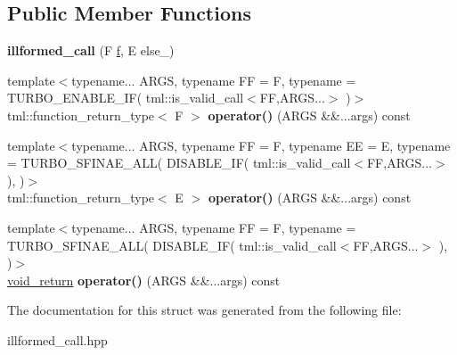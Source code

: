 \subsection*{Public Member Functions}
\begin{DoxyCompactItemize}
\item 
\hypertarget{structtml_1_1runtime_1_1illformed__call_a14d3576d333931e364d0717a5c438d69}{{\bfseries illformed\+\_\+call} (F \hyperlink{structf}{f}, E else\+\_\+)}\label{structtml_1_1runtime_1_1illformed__call_a14d3576d333931e364d0717a5c438d69}

\item 
\hypertarget{structtml_1_1runtime_1_1illformed__call_a52f1eca7b1c4be18fc23d7affe031c80}{{\footnotesize template$<$typename... A\+R\+G\+S, typename F\+F  = F, typename  = T\+U\+R\+B\+O\+\_\+\+E\+N\+A\+B\+L\+E\+\_\+\+I\+F( tml\+::is\+\_\+valid\+\_\+call$<$\+F\+F,\+A\+R\+G\+S...$>$ )$>$ }\\tml\+::function\+\_\+return\+\_\+type$<$ F $>$ {\bfseries operator()} (A\+R\+G\+S \&\&...args) const }\label{structtml_1_1runtime_1_1illformed__call_a52f1eca7b1c4be18fc23d7affe031c80}

\item 
\hypertarget{structtml_1_1runtime_1_1illformed__call_ae131466cf178fabdecf582c2b2ee05e9}{{\footnotesize template$<$typename... A\+R\+G\+S, typename F\+F  = F, typename E\+E  = E, typename  = T\+U\+R\+B\+O\+\_\+\+S\+F\+I\+N\+A\+E\+\_\+\+A\+L\+L( D\+I\+S\+A\+B\+L\+E\+\_\+\+I\+F( tml\+::is\+\_\+valid\+\_\+call$<$\+F\+F,\+A\+R\+G\+S...$>$ ),                                                )$>$ }\\tml\+::function\+\_\+return\+\_\+type$<$ E $>$ {\bfseries operator()} (A\+R\+G\+S \&\&...args) const }\label{structtml_1_1runtime_1_1illformed__call_ae131466cf178fabdecf582c2b2ee05e9}

\item 
\hypertarget{structtml_1_1runtime_1_1illformed__call_a57742c7d8ed5cfc900bfa3d54d4df8e5}{{\footnotesize template$<$typename... A\+R\+G\+S, typename F\+F  = F, typename  = T\+U\+R\+B\+O\+\_\+\+S\+F\+I\+N\+A\+E\+\_\+\+A\+L\+L( D\+I\+S\+A\+B\+L\+E\+\_\+\+I\+F( tml\+::is\+\_\+valid\+\_\+call$<$\+F\+F,\+A\+R\+G\+S...$>$ ),                                                                                     )$>$ }\\\hyperlink{structtml_1_1runtime_1_1illformed__call_1_1void__return}{void\+\_\+return} {\bfseries operator()} (A\+R\+G\+S \&\&...args) const }\label{structtml_1_1runtime_1_1illformed__call_a57742c7d8ed5cfc900bfa3d54d4df8e5}

\end{DoxyCompactItemize}


The documentation for this struct was generated from the following file\+:\begin{DoxyCompactItemize}
\item 
illformed\+\_\+call.\+hpp\end{DoxyCompactItemize}
